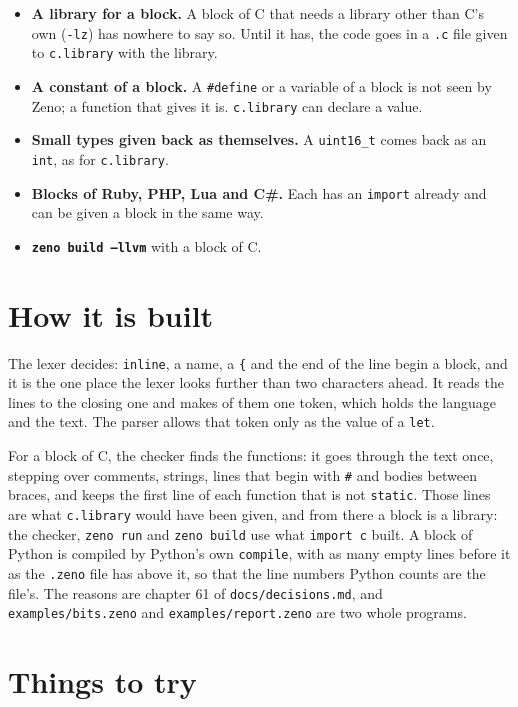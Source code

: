 \begin{itemize}
\item \textbf{A library for a block.} A block of C that needs a
  library other than C's own (\verb|-lz|) has nowhere to say so. Until
  it has, the code goes in a \verb|.c| file given to \verb|c.library|
  with the library.
\item \textbf{A constant of a block.} A \verb|#define| or a variable
  of a block is not seen by Zeno; a function that gives it is.
  \verb|c.library| can declare a value.
\item \textbf{Small types given back as themselves.} A
  \verb|uint16_t| comes back as an \verb|int|, as for
  \verb|c.library|.
\item \textbf{Blocks of Ruby, PHP, Lua and C\#.} Each has an
  \verb|import| already and can be given a block in the same way.
\item \textbf{\texttt{zeno build --llvm}} with a block of C.
\end{itemize}

\section{How it is built}

The lexer decides: \verb|inline|, a name, a \verb|{| and the end of
the line begin a block, and it is the one place the lexer looks
further than two characters ahead. It reads the lines to the closing
one and makes of them one token, which holds the language and the
text. The parser allows that token only as the value of a
\verb|let|.

For a block of C, the checker finds the functions: it goes through
the text once, stepping over comments, strings, lines that begin with
\verb|#| and bodies between braces, and keeps the first line of each
function that is not \verb|static|. Those lines are what
\verb|c.library| would have been given, and from there a block is a
library: the checker, \verb|zeno run| and \verb|zeno build| use what
\verb|import c| built. A block of Python is compiled by Python's own
\verb|compile|, with as many empty lines before it as the
\verb|.zeno| file has above it, so that the line numbers Python
counts are the file's. The reasons are chapter 61 of
\verb|docs/decisions.md|, and \verb|examples/bits.zeno| and
\verb|examples/report.zeno| are two whole programs.

\section{Things to try}


